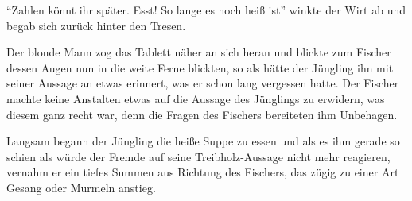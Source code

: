 ``Zahlen könnt ihr später. Esst! So lange es noch heiß ist'' winkte der Wirt ab und begab sich zurück hinter den Tresen.

Der blonde Mann zog das Tablett näher an sich heran und blickte zum Fischer dessen Augen nun in die weite Ferne blickten, so als hätte der Jüngling ihn mit seiner Aussage an etwas erinnert, was er schon lang vergessen hatte. Der Fischer machte keine Anstalten etwas auf die Aussage des Jünglings zu erwidern, was diesem ganz recht war, denn die Fragen des Fischers bereiteten ihm Unbehagen.

Langsam begann der Jüngling die heiße Suppe zu essen und als es ihm gerade so schien als würde der Fremde auf seine Treibholz-Aussage nicht mehr reagieren, vernahm er ein tiefes Summen aus Richtung des Fischers, das zügig zu einer Art Gesang oder Murmeln anstieg.

